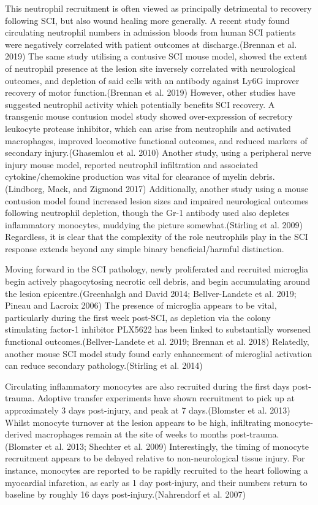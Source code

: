 \documentclass[9pt,lineno]{elife}
\begin{document}
\begin{landscape}
\begin{landscape}
This neutrophil recruitment is often viewed as principally detrimental to recovery following SCI, but also wound healing more generally.
A recent study found circulating neutrophil numbers in admission bloods from human SCI patients were negatively correlated with patient outcomes at discharge.(Brennan et al. 2019) The same study utilising a contusive SCI mouse model, showed the extent of neutrophil presence at the lesion site inversely correlated with neurological outcomes, and depletion of said cells with an antibody against Ly6G improver recovery of motor function.(Brennan et al. 2019) However, other studies have suggested neutrophil activity which potentially benefits SCI recovery.
A transgenic mouse contusion model study showed over-expression of secretory leukocyte protease inhibitor, which can arise from neutrophils and activated macrophages, improved locomotive functional outcomes, and reduced markers of secondary injury.(Ghasemlou et al. 2010) Another study, using a peripheral nerve injury mouse model, reported neutrophil infiltration and associated cytokine/chemokine production was vital for clearance of myelin debris.(Lindborg, Mack, and Zigmond 2017) Additionally, another study using a mouse contusion model found increased lesion sizes and impaired neurological outcomes following neutrophil depletion, though the Gr-1 antibody used also depletes inflammatory monocytes, muddying the picture somewhat.(Stirling et al. 2009) Regardless, it is clear that the complexity of the role neutrophils play in the SCI response extends beyond any simple binary beneficial/harmful distinction.

Moving forward in the SCI pathology, newly proliferated and recruited microglia begin actively phagocytosing necrotic cell debris, and begin accumulating around the lesion epicentre.(Greenhalgh and David 2014; Bellver-Landete et al. 2019; Pineau and Lacroix 2006) The presence of microglia appears to be vital, particularly during the first week post-SCI, as depletion via the colony stimulating factor-1 inhibitor PLX5622 has been linked to substantially worsened functional outcomes.(Bellver-Landete et al. 2019; Brennan et al. 2018) Relatedly, another mouse SCI model study found early enhancement of microglial activation can reduce secondary pathology.(Stirling et al. 2014)

Circulating inflammatory monocytes are also recruited during the first days post-trauma.
Adoptive transfer experiments have shown recruitment to pick up at approximately 3 days post-injury, and peak at 7 days.(Blomster et al. 2013) Whilst monocyte turnover at the lesion appears to be high, infiltrating monocyte-derived macrophages remain at the site of weeks to months post-trauma.(Blomster et al. 2013; Shechter et al. 2009) Interestingly, the timing of monocyte recruitment appears to be delayed relative to non-neurological tissue injury.
For instance, monocytes are reported to be rapidly recruited to the heart following a myocardial infarction, as early as 1 day post-injury, and their numbers return to baseline by roughly 16 days post-injury.(Nahrendorf et al. 2007)


\end{landscape}
\end{landscape}
\end{document}
